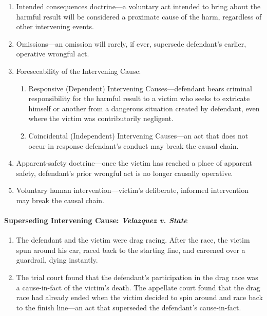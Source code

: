 \begin{enumerate}
\begin{enumerate}
        \item Intended consequences doctrine---a voluntary act intended to bring about the harmful result will be considered a proximate cause of the harm, regardless of other intervening events.
        \item Omissions---an omission will rarely, if ever, supersede defendant's earlier, operative wrongful act.
        \item Foreseeability of the Intervening Cause:
        \begin{enumerate}
            \item Responsive (Dependent) Intervening Causes---defendant bears criminal responsibility for the harmful result to a victim who seeks to extricate himself or another from a dangerous situation created by defendant, even where the victim was contributorily negligent.
            \item Coincidental (Independent) Intervening Causes---an act that does not occur in response defendant's conduct may break the causal chain.
        \end{enumerate}
        \item Apparent-safety doctrine---once the victim has reached a place of apparent safety, defendant's prior wrongful act is no longer causally operative.
        \item Voluntary human intervention---victim's deliberate, informed intervention may break the causal chain.
    \end{enumerate}
\end{enumerate}

\paragraph{Superseding Intervening Cause: \emph{Velazquez v. State}}

\begin{enumerate}
    \item The defendant and the victim were drag racing. After the race, the victim spun around his car, raced back to the starting line, and careened over a guardrail, dying instantly.
    \item The trial court found that the defendant's participation in the drag race was a cause-in-fact of the victim's death. The appellate court found that the drag race had already ended when the victim decided to spin around and race back to the finish line---an act that superseded the defendant's cause-in-fact.
\end{enumerate}
